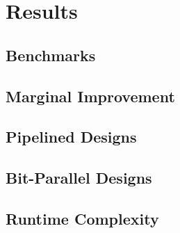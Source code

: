 \section{Results}\label{sec:results}

\subsection{Benchmarks}\label{sec:results:benchmark}

\subsection{Marginal Improvement}\label{sec:results:margin}

\subsection{Pipelined Designs}\label{sec:results:retiming}

\subsection{Bit-Parallel Designs}\label{sec:results:scalability}

\subsection{Runtime Complexity}\label{sec:results:complexity}
